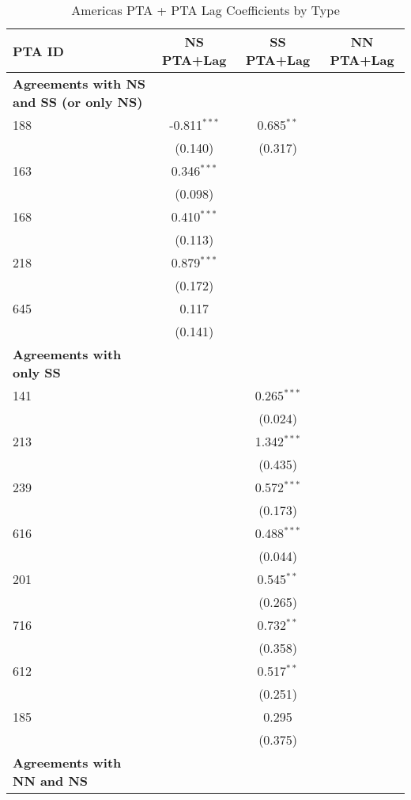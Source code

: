 \begin{table}[htbp]
    \centering
    \caption{Americas PTA + PTA Lag Coefficients by Type}
    \label{tab:americas_pta}
    \begin{adjustbox}{max width=\textwidth}
    \begin{tabular}{lccc}
    \hline
    \textbf{PTA ID} & \textbf{NS PTA+Lag} & \textbf{SS PTA+Lag} & \textbf{NN PTA+Lag} \\
    \hline
    \textbf{Agreements with NS and SS (or only NS)} &  &  &  \\
    \hline
    188 & -0.811$^{\ast\ast\ast}$ & 0.685$^{\ast\ast}$ &  \\
    & (0.140) & (0.317) & \\
    163 & 0.346$^{\ast\ast\ast}$ &  &  \\
    & (0.098) &  &  \\
    168 & 0.410$^{\ast\ast\ast}$ &  &  \\
    & (0.113) &  &  \\
    218 & 0.879$^{\ast\ast\ast}$ &  &  \\
    & (0.172) &  &  \\
    645 & 0.117 &  &  \\
    & (0.141) &  &  \\
    \hline
    \textbf{Agreements with only SS} &  &  &  \\
    \hline
    141 &  & 0.265$^{\ast\ast\ast}$ &  \\
    &  & (0.024) &  \\
    213 &  & 1.342$^{\ast\ast\ast}$ &  \\
    &  & (0.435) &  \\
    239 &  & 0.572$^{\ast\ast\ast}$ &  \\
    &  & (0.173) &  \\
    616 &  & 0.488$^{\ast\ast\ast}$ &  \\
    &  & (0.044) &  \\
    201 &  & 0.545$^{\ast\ast}$ &  \\
    &  & (0.265) &  \\
    716 &  & 0.732$^{\ast\ast}$ &  \\
    &  & (0.358) &  \\
    612 &  & 0.517$^{\ast\ast}$ &  \\
    &  & (0.251) &  \\
    185 &  & 0.295 &  \\
    &  & (0.375) &  \\
    \hline
    \textbf{Agreements with NN and NS} &  &  &  \\

\end{tabular}
\end{adjustbox}
\end{table}
